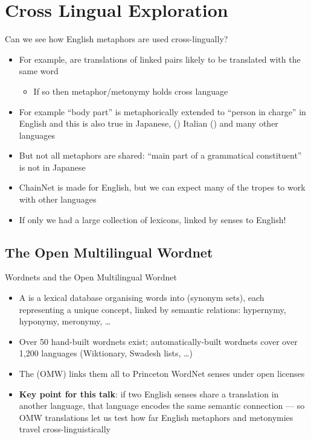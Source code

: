 \documentclass[xetex]{beamer}
\begin{document}
\section{Cross Lingual Exploration}
\begin{frame}{Can we see how English metaphors are used cross-lingually?}
  \begin{itemize}
  \item For example, are translations of linked pairs likely to be
    translated with the same word
    \begin{itemize}
    \item If so then metaphor/metonymy holds cross language
    \end{itemize}
  \item For example  ``body part'' is metaphorically
    extended to ``person in charge'' in English and this is also true in Japanese,
    () Italian () and many other languages
  \item But not all metaphors are shared:   ``main part of a grammatical constituent'' is not  in Japanese
    \bigskip
  \item ChainNet is made for English, but we can expect many of the
    tropes to work with other languages
  \item If only we had a large collection of lexicons, linked by senses to English!
    

  \end{itemize}
\end{frame}

\subsection{The Open Multilingual Wordnet}
\begin{frame}{Wordnets and the Open Multilingual Wordnet}
  \begin{itemize}
  \item A  is a lexical database organising words into
     (synonym sets), each representing a unique concept,
    linked by semantic relations: hypernymy, hyponymy, meronymy, \ldots
  \item Over 50 hand-built wordnets exist; automatically-built wordnets
    cover over 1{,}200 languages (Wiktionary, Swadesh lists, \ldots)
  \item The  (OMW) links them all to
    Princeton WordNet senses under open licenses \citep{Bond:Foster:2013}
  \item \textbf{Key point for this talk}: if two English senses share a
    translation in another language, that language encodes the same
    semantic connection --- so OMW translations let us test how far
    English metaphors and metonymies travel cross-linguistically
  \end{itemize}
\end{frame}
\end{document}
